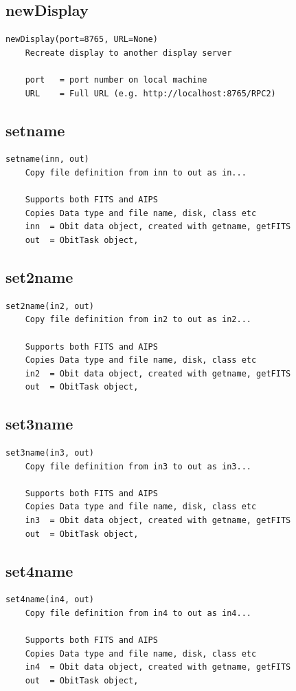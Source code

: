 \documentclass[11pt]{report}
\begin{document}
\subsection{newDisplay}
\begin{verbatim}
newDisplay(port=8765, URL=None)
    Recreate display to another display server
    
    port   = port number on local machine
    URL    = Full URL (e.g. http://localhost:8765/RPC2)
\end{verbatim}

\subsection{setname}
\begin{verbatim}
setname(inn, out)
    Copy file definition from inn to out as in...
    
    Supports both FITS and AIPS
    Copies Data type and file name, disk, class etc
    inn  = Obit data object, created with getname, getFITS
    out  = ObitTask object,
\end{verbatim}

\subsection{set2name}
\begin{verbatim}
set2name(in2, out)
    Copy file definition from in2 to out as in2...
    
    Supports both FITS and AIPS
    Copies Data type and file name, disk, class etc
    in2  = Obit data object, created with getname, getFITS
    out  = ObitTask object,
\end{verbatim}

\subsection{set3name}
\begin{verbatim}
set3name(in3, out)
    Copy file definition from in3 to out as in3...
    
    Supports both FITS and AIPS
    Copies Data type and file name, disk, class etc
    in3  = Obit data object, created with getname, getFITS
    out  = ObitTask object,
\end{verbatim}

\subsection{set4name}
\begin{verbatim}
set4name(in4, out)
    Copy file definition from in4 to out as in4...
    
    Supports both FITS and AIPS
    Copies Data type and file name, disk, class etc
    in4  = Obit data object, created with getname, getFITS
    out  = ObitTask object,
\end{verbatim}
\end{document}
